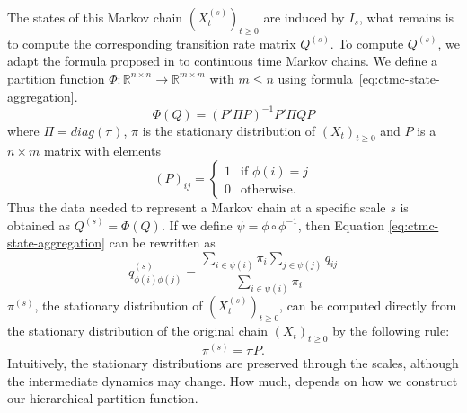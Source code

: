 The states of this Markov chain $(X_t^{(s)})_{t \ge 0}$ are induced by $I_s$, what remains is to compute the corresponding  transition
rate matrix $Q^{(s)}$. To compute $Q^{(s)}$, we adapt the formula
proposed in \cite{5746509} to continuous time Markov chains. We define a partition function
$\Phi: \mathbb{R}^{n \times n} \rightarrow \mathbb{R}^{m \times m}$ with $m \le n$ using formula~\ref{eq:ctmc-state-aggregation}.
\begin{equation}
	\label{eq:ctmc-state-aggregation}
	\Phi(Q) = (P' \Pi P)^{-1} P' \Pi Q P
\end{equation}
where $\Pi = diag(\pi)$, $\pi$ is the stationary distribution of $(X_t)_{t \ge 0}$ and $P$ is a 
$n \times m$ matrix with elements
\begin{equation}
	\nonumber
	\left(P\right)_{ij} = 
		\left\{
			\begin{array}{ll}
				1 & \mbox{if } \phi(i) = j \\
				0 & \mbox{otherwise}.
			\end{array}
		\right.
\end{equation}
Thus the data needed to represent a Markov chain at a specific scale $s$ is obtained as $Q^{(s)} = \Phi(Q)$.
If we define $\psi = \phi \circ \phi^{-1}$, then Equation \ref{eq:ctmc-state-aggregation} can be rewritten as
\begin{equation}
	\nonumber
	q_{\phi(i)\phi(j)}^{(s)} = \frac{\sum\limits_{i \in \psi(i)}\pi_i \sum\limits_{j \in \psi(j)} q_{ij}}{\sum\limits_{i \in \psi(i)}\pi_i}
\end{equation}
$\pi^{(s)}$, the stationary distribution of $(X_t^{(s)})_{t \ge 0}$, can be computed directly from
the stationary distribution of the original chain $(X_t)_{t \ge 0}$ by the following rule:
\begin{equation}
	\nonumber
	\pi^{(s)} = \pi P.
\end{equation}
Intuitively, the stationary distributions are preserved through the scales, although the intermediate dynamics may change. How much, depends on how we construct our hierarchical partition function. 
